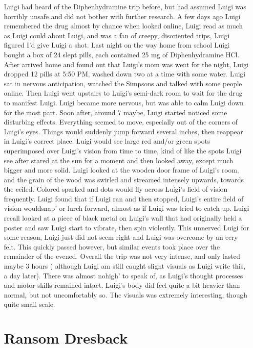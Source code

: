 \documentclass[12pt]{book}
\begin{document}
Luigi had heard of the Diphenhydramine trip before, but had assumed Luigi was horribly unsafe and did not bother with further research. A few days ago Luigi remembered the drug almost by chance when looked online, Luigi read as much as Luigi could about Luigi, and was a fan of creepy, disoriented trips, Luigi figured I'd give Luigi a shot. Last night on the way home from school Luigi bought a box of 24 slept pills, each contained 25 mg of Diphenhydramine HCl. After arrived home and found out that Luigi's mom was went for the night, Luigi dropped 12 pills at 5:50 PM, washed down two at a time with some water. Luigi sat in nervous anticipation, watched the Simpsons and talked with some people online. Then Luigi went upstairs to Luigi's semi-dark room to wait for the drug to manifest Luigi. Luigi became more nervous, but was able to calm Luigi down for the most part. Soon after, around 7 maybe, Luigi started noticed some disturbing effects. Everything seemed to move, especially out of the corners of Luigi's eyes. Things would suddenly jump forward several inches, then reappear in Luigi's correct place. Luigi would see large red and/or green spots superimposed over Luigi's vision from time to time, kind of like the spots Luigi see after stared at the sun for a moment and then looked away, except much bigger and more solid. Luigi looked at the wooden door frame of Luigi's room, and the grain of the wood was swirled and streamed intensely upwards, towards the ceiled. Colored sparked and dots would fly across Luigi's field of vision frequently. Luigi found that if Luigi ran and then stopped, Luigi's entire field of vision wouldsnap' or lurch forward, almost as if Luigi was tried to catch up. Luigi recall looked at a piece of black metal on Luigi's wall that had originally held a poster and saw Luigi start to vibrate, then spin violently. This unnerved Luigi for some reason, Luigi just did not seem right and Luigi was overcome by an eery felt. This quickly passed however, but similar events took place over the remainder of the evened. Overall the trip was not very intense, and only lasted maybe 3 hours ( although Luigi am still caught slight visuals as Luigi write this, a day later). There was almost nohigh' to speak of, as Luigi's thought processes and motor skills remained intact. Luigi's body did feel quite a bit heavier than normal, but not uncomfortably so. The visuals was extremely interesting, though quite small scale.



\chapter{Ransom Dresback}
\end{document}
